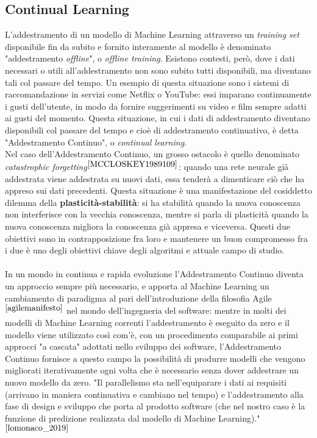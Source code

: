 \subsection{Continual Learning} L'addestramento di un modello di Machine Learning attraverso un \textit{training set} disponibile fin da subito e fornito interamente al modello è denominato "addestramento \textit{offline}", o \textit{offline training}. Esistono contesti, però, dove i dati necessari o utili all'addestramento non sono subito tutti disponibili, ma diventano tali col passare del tempo. Un esempio di questa situazione sono i sistemi di raccomandazione in servizi come Netflix o YouTube: essi imparano continuamente i gusti dell'utente, in modo da fornire suggerimenti su video e film sempre adatti ai gusti del momento. Questa situazione, in cui i dati di addestramento diventano disponibili col passare del tempo e cioè di addestramento continuativo, è detta "Addestramento Continuo", o \textit{continual learning}.\\
Nel caso dell'Addestramento Continuo, un grosso ostacolo è quello denominato \textit{catastrophic forgetting}$^{\cite{MCCLOSKEY1989109}}$: quando una rete neurale già addestrata viene addestrata su nuovi dati, essa tenderà a dimenticare ciò che ha appreso sui dati precedenti. Questa situazione è una manifestazione del cosiddetto dilemma della \textbf{plasticità-stabilità}: si ha stabilità quando la nuova conoscenza non interferisce con la vecchia conoscenza, mentre si parla di plasticità quando la nuova conoscenza migliora la conoscenza già appresa e viceversa. Questi due obiettivi sono in contrapposizione fra loro e mantenere un buon compromesso fra i due è uno degli obiettivi chiave degli algoritmi e attuale campo di studio.\\\\
In un mondo in continua e rapida evoluzione l'Addestramento Continuo diventa un approccio sempre più necessario, e apporta al Machine Learning un cambiamento di paradigma al pari dell'introduzione della filosofia Agile$^{\cite{agilemanifesto}}$ nel mondo dell'ingegneria del software: mentre in molti dei modelli di Machine Learning correnti l'addestramento è eseguito da zero e il modello viene utilizzato così com'è, con un procedimento comparabile ai primi approcci "a cascata" adottati nello sviluppo dei software, l'Addestramento Continuo fornisce a questo campo la possibilità di produrre modelli che vengono migliorati iterativamente ogni volta che è necessario senza dover addestrare un nuovo modello da zero. "Il parallelismo sta nell'equiparare i dati ai requisiti (arrivano in maniera continuativa e cambiano nel tempo) e l'addestramento alla fase di design e sviluppo che porta al prodotto software (che nel nostro caso è la funzione di predizione realizzata dal modello di Machine Learning)."$^{\cite{lomonaco_2019}}$
